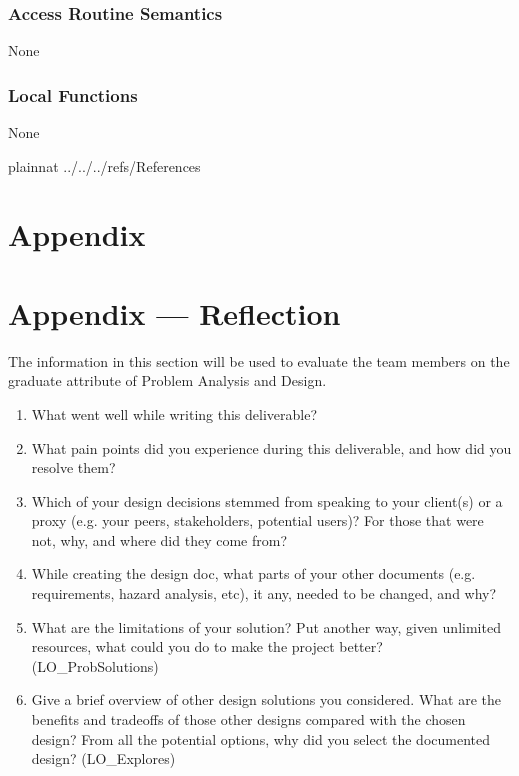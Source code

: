 \documentclass[12pt, titlepage]{article}
\begin{document}
\subsubsection{Access Routine Semantics}
None

\subsubsection{Local Functions}
None

\newpage

 {plainnat}
 {../../../refs/References}

\newpage

\section{Appendix} \label{Appendix}


\newpage{}

\section*{Appendix --- Reflection}


The information in this section will be used to evaluate the team members on the
graduate attribute of Problem Analysis and Design.



\begin{enumerate}
  \item What went well while writing this deliverable? 
  \item What pain points did you experience during this deliverable, and how
    did you resolve them?
  \item Which of your design decisions stemmed from speaking to your client(s)
  or a proxy (e.g. your peers, stakeholders, potential users)? For those that
  were not, why, and where did they come from?
  \item While creating the design doc, what parts of your other documents (e.g.
  requirements, hazard analysis, etc), it any, needed to be changed, and why?
  \item What are the limitations of your solution?  Put another way, given
  unlimited resources, what could you do to make the project better? (LO\_ProbSolutions)
  \item Give a brief overview of other design solutions you considered.  What
  are the benefits and tradeoffs of those other designs compared with the chosen
  design?  From all the potential options, why did you select the documented design?
  (LO\_Explores)
\end{enumerate}
\end{document}
